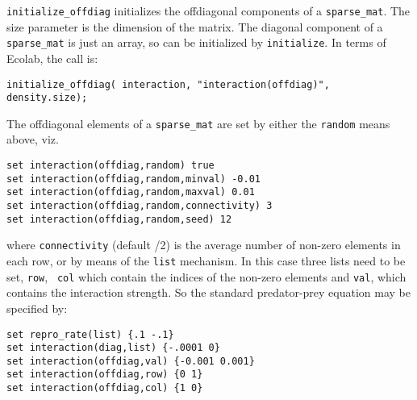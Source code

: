 {\tt initialize\_offdiag} initializes the offdiagonal components of a
{\tt sparse\_mat}. The size parameter is the dimension of the matrix.
The diagonal component of a {\tt sparse\_mat} is just an array, so can
be initialized by {\tt initialize}. In terms of Ecolab, the call is:
\begin{verbatim}
initialize_offdiag( interaction, "interaction(offdiag)", density.size);
\end{verbatim}

The offdiagonal elements of a {\tt sparse\_mat} are set by either the
\verb|random| means above, viz.
\begin{verbatim}
set interaction(offdiag,random) true
set interaction(offdiag,random,minval) -0.01
set interaction(offdiag,random,maxval) 0.01
set interaction(offdiag,random,connectivity) 3
set interaction(offdiag,random,seed) 12
\end{verbatim}
where \verb|connectivity| (default \nsp/2) is the average number of
non-zero elements in each row, or by means of the \verb|list|
mechanism. In this case three lists need to be set, \verb|row|, {\tt
col} which contain the indices of the non-zero elements and
\verb|val|, which contains the interaction strength. So the standard
predator-prey equation may be specified by:
\begin{verbatim}
set repro_rate(list) {.1 -.1}
set interaction(diag,list) {-.0001 0}
set interaction(offdiag,val) {-0.001 0.001}
set interaction(offdiag,row) {0 1}
set interaction(offdiag,col) {1 0}
\end{verbatim}

